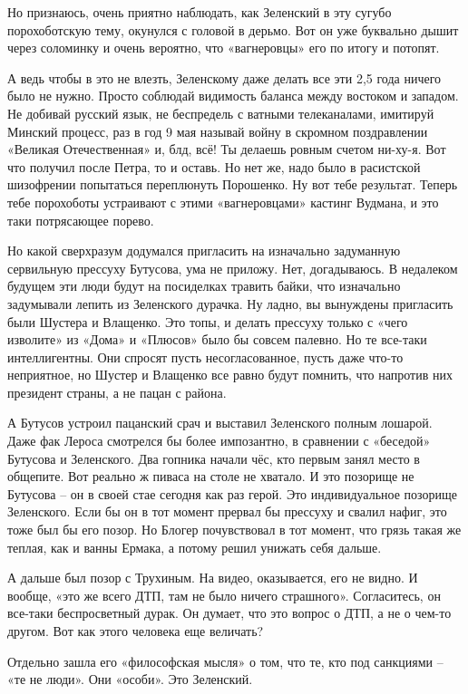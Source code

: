 Но признаюсь, очень приятно наблюдать, как Зеленский в эту сугубо порохоботскую
тему, окунулся с головой в дерьмо. Вот он уже буквально дышит через соломинку и
очень вероятно, что «вагнеровцы» его по итогу и потопят.

А ведь чтобы в это не влезть, Зеленскому даже делать все эти 2,5 года ничего
было не нужно. Просто соблюдай видимость баланса между востоком и западом. Не
добивай русский язык, не беспредель с ватными телеканалами, имитируй Минский
процесс, раз в год 9 мая называй войну в скромном поздравлении «Великая
Отечественная» и, блд, всё! Ты делаешь ровным счетом ни-ху-я. Вот что получил
после Петра, то и оставь. Но нет же, надо было в расистской шизофрении
попытаться переплюнуть Порошенко. Ну вот тебе результат. Теперь тебе порохоботы
устраивают с этими «вагнеровцами» кастинг Вудмана, и это таки потрясающее
порево.

Но какой сверхразум додумался пригласить на изначально задуманную сервильную
прессуху Бутусова, ума не приложу. Нет, догадываюсь. В недалеком будущем эти
люди будут на посиделках травить байки, что изначально задумывали лепить из
Зеленского дурачка. Ну ладно, вы вынуждены пригласить были Шустера и Влащенко.
Это топы, и делать прессуху только с «чего изволите» из «Дома» и «Плюсов» было
бы совсем палевно. Но те все-таки интеллигентны. Они спросят пусть
несогласованное, пусть даже что-то неприятное, но Шустер и Влащенко все равно
будут помнить, что напротив них президент страны, а не пацан с района.

А Бутусов устроил пацанский срач и выставил Зеленского полным лошарой. Даже фак
Лероса смотрелся бы более импозантно, в сравнении с «беседой» Бутусова и
Зеленского. Два гопника начали чёс, кто первым занял место в общепите. Вот
реально ж пиваса на столе не хватало. И это позорище не Бутусова – он в своей
стае сегодня как раз герой. Это индивидуальное позорище Зеленского. Если бы он
в тот момент прервал бы прессуху и свалил нафиг, это тоже был бы его позор. Но
Блогер почувствовал в тот момент, что грязь такая же теплая, как и ванны
Ермака, а потому решил унижать себя дальше.

А дальше был позор с Трухиным. На видео, оказывается, его не видно. И вообще,
«это же всего ДТП, там не было ничего страшного». Согласитесь, он все-таки
беспросветный дурак. Он думает, что это вопрос о ДТП, а не о чем-то другом. Вот
как этого человека еще величать?

Отдельно зашла его «философская мысля» о том, что те, кто под санкциями – «те
не люди». Они «особи». Это Зеленский.

